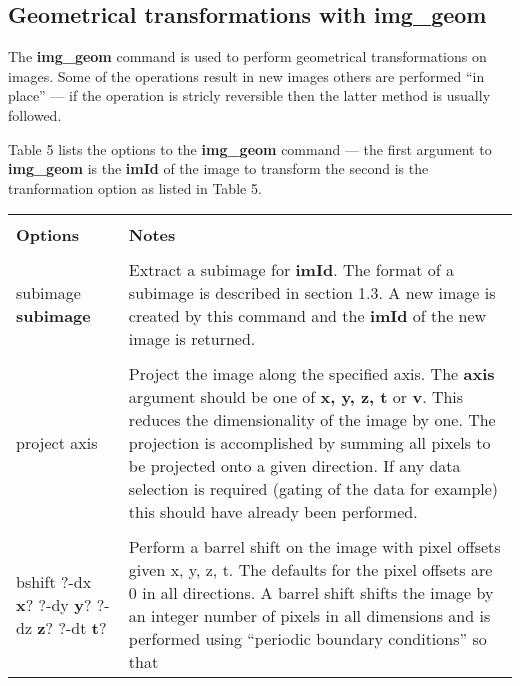 \subsection{Geometrical transformations with img\_geom}

The {\bf img\_geom} command is used to perform geometrical transformations
on images.  Some of the operations result in new images others are
performed ``in place'' --- if the operation is stricly reversible then the
latter method is usually followed.

Table 5 lists the options to the {\bf img\_geom} command --- the first
argument to {\bf img\_geom} is the {\bf imId} of the image to transform
the second is the tranformation option as listed in Table 5.

\begin{table}
\begin{tabular}{|l||l|}
\hline
& \\
{\bf Options} & {\bf Notes} \\
& \\ \hline
subimage {\bf subimage} &
\begin{minipage}[t]{11.0cm}
Extract a subimage for {\bf imId}.  The format of a subimage is described in
section 1.3.  A new image is created by this command and the {\bf imId} of the
new image is returned.
\end{minipage} \\
& \\
project axis &
\begin{minipage}[t]{11.0cm}
Project the image along the specified axis.  The {\bf axis} argument
should be one of {\bf x, y, z, t} or {\bf v}.  This reduces the
dimensionality of the image by one.  The projection is accomplished
by summing all pixels to be projected onto a given direction.  If
any data selection is required (gating of the data for example) this
should have already been performed.
\end{minipage} \\
& \\
\begin{minipage}[t]{4.0cm}
\flushleft
bshift 
?-dx {\bf x}?
?-dy {\bf y}?
?-dz {\bf z}?
?-dt {\bf t}?
\end{minipage} &
\begin{minipage}[t]{11.0cm}
Perform a barrel shift on the image with pixel offsets given
x, y, z, t.  The defaults for the pixel offsets are 0 in all directions.
A barrel shift shifts the image by an integer number of pixels in all
dimensions and is performed using ``periodic boundary conditions'' so that

\end{minipage}
\end{tabular}
\end{table}
